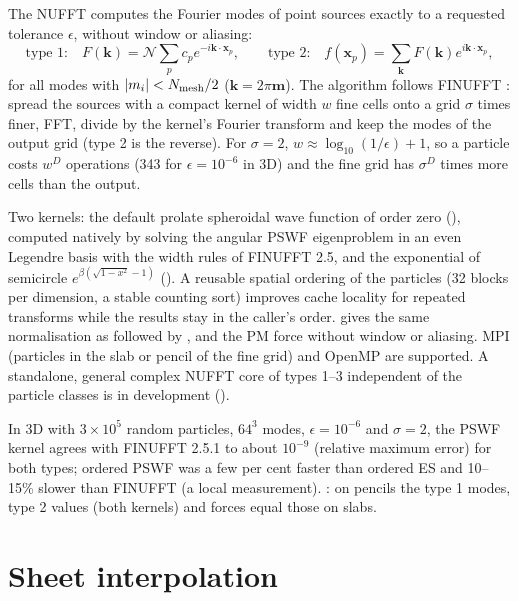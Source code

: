 The NUFFT computes the Fourier modes of point sources exactly to a requested tolerance $\epsilon$, without window or aliasing:
\begin{equation}
\text{type 1:}\quad F(\bm k)=\mathcal N\sum_pc_pe^{-i\bm k\cdot\bm x_p},\qquad
\text{type 2:}\quad f(\bm x_p)=\sum_{\bm k}F(\bm k)e^{i\bm k\cdot\bm x_p},
\end{equation}
for all modes with $|m_i|<N_{\rm mesh}/2$ ($\bm k=2\pi\bm m$). The algorithm follows FINUFFT \cite{Barnett2019}: spread the sources with a
compact kernel of width $w$ fine cells onto a grid $\sigma$ times finer, FFT, divide by the kernel's Fourier transform and keep the modes
of the output grid (type 2 is the reverse). For $\sigma=2$, $w\approx\log_{10}(1/\epsilon)+1$, so a particle costs $w^D$ operations (343
for $\epsilon=10^{-6}$ in 3D) and the fine grid has $\sigma^D$ times more cells than the output.

Two kernels: the default prolate spheroidal wave function of order zero (), computed natively by solving the angular
PSWF eigenproblem in an even Legendre basis \cite{Osipov2013} with the width rules of FINUFFT 2.5, and the exponential of semicircle
$e^{\beta(\sqrt{1-x^2}-1)}$ (). A reusable spatial ordering of the particles (32 blocks per dimension, a stable counting sort)
improves cache locality for repeated transforms while the results stay in the caller's order. 
gives the same normalisation as  followed by , and  the PM
force without window or aliasing. MPI (particles in the slab or pencil of the fine grid) and OpenMP are supported. A standalone,
general complex NUFFT core of types 1--3 independent of the particle classes is in development ().

\begin{validation}
In 3D with $3\times10^5$ random particles, $64^3$ modes, $\epsilon=10^{-6}$ and $\sigma=2$, the PSWF kernel agrees with FINUFFT 2.5.1 to
about $10^{-9}$ (relative maximum error) for both types; ordered PSWF was a few per cent faster than ordered ES and 10--15\% slower than
FINUFFT (a local measurement). : on pencils the type 1 modes, type 2 values (both kernels) and forces
equal those on slabs.
\end{validation}

\section{Sheet interpolation}\label{sec:ma-sheet}

